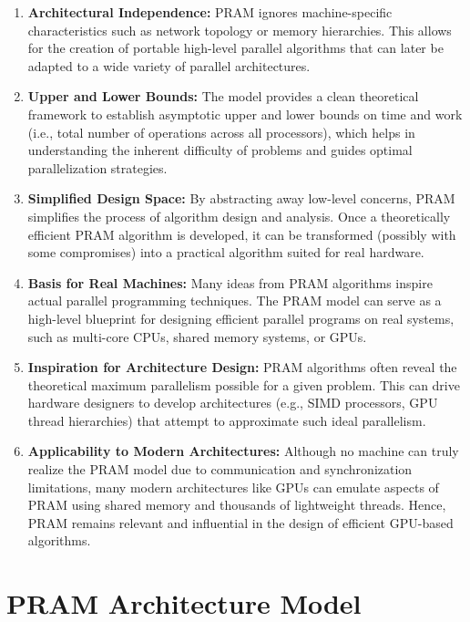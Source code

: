 \documentclass[12pt]{book}
\begin{document}
\begin{enumerate}
    \item \textbf{Architectural Independence:} PRAM ignores machine-specific characteristics such as network topology or memory hierarchies. This allows for the creation of portable high-level parallel algorithms that can later be adapted to a wide variety of parallel architectures.
    
    \item \textbf{Upper and Lower Bounds:} The model provides a clean theoretical framework to establish asymptotic upper and lower bounds on time and work (i.e., total number of operations across all processors), which helps in understanding the inherent difficulty of problems and guides optimal parallelization strategies.
    
    \item \textbf{Simplified Design Space:} By abstracting away low-level concerns, PRAM simplifies the process of algorithm design and analysis. Once a theoretically efficient PRAM algorithm is developed, it can be transformed (possibly with some compromises) into a practical algorithm suited for real hardware.
    
    \item \textbf{Basis for Real Machines:} Many ideas from PRAM algorithms inspire actual parallel programming techniques. The PRAM model can serve as a high-level blueprint for designing efficient parallel programs on real systems, such as multi-core CPUs, shared memory systems, or GPUs.
    
    \item \textbf{Inspiration for Architecture Design:} PRAM algorithms often reveal the theoretical maximum parallelism possible for a given problem. This can drive hardware designers to develop architectures (e.g., SIMD processors, GPU thread hierarchies) that attempt to approximate such ideal parallelism.
    
    \item \textbf{Applicability to Modern Architectures:} Although no machine can truly realize the PRAM model due to communication and synchronization limitations, many modern architectures like GPUs can emulate aspects of PRAM using shared memory and thousands of lightweight threads. Hence, PRAM remains relevant and influential in the design of efficient GPU-based algorithms.
\end{enumerate}

\section{PRAM Architecture Model}
\end{document}
